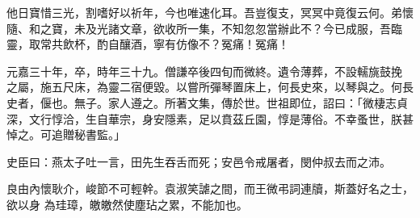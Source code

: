 \begin{pinyinscope}
 他日寶惜三光，割嗜好以祈年，今也唯速化耳。吾豈復支，冥冥中竟復云何。弟懷隨、和之寶，未及光諸文章，欲收所一集，不知忽忽當辦此不？今已成服，吾臨靈，取常共飲杯，酌自釀酒，寧有仿像不？冤痛！冤痛！



 元嘉三十年，卒，時年三十九。僧謙卒後四旬而微終。遺令薄葬，不設轜旐鼓挽
 之屬，施五尺床，為靈二宿便毀。以嘗所彈琴置床上，何長史來，以琴與之。何長史者，偃也。無子。家人遵之。所著文集，傳於世。世祖即位，詔曰：「微棲志貞深，文行惇洽，生自華宗，身安隱素，足以賁茲丘園，惇是薄俗。不幸蚤世，朕甚悼之。可追贈秘書監。」



 史臣曰：燕太子吐一言，田先生吞舌而死；安邑令戒屠者，閔仲叔去而之沛。



 良由內懷耿介，峻節不可輕幹。袁淑笑謔之間，而王微弔詞連牘，斯蓋好名之士，欲以身
 為珪璋，皦皦然使塵玷之累，不能加也。



\end{pinyinscope}